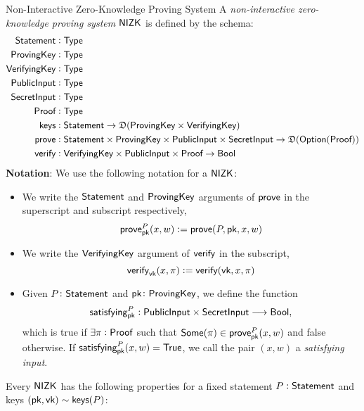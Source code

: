 \begin{definitiontoc}{Non-Interactive Zero-Knowledge Proving System}
    A \emph{non-interactive zero-knowledge proving system} ${\textsf{NIZK}}$ is defined by the schema:
    \begin{align*}
        {\textsf{Statement}}    &: {\textsf{Type}} \\
        {\textsf{ProvingKey}}   &: {\textsf{Type}} \\
        {\textsf{VerifyingKey}} &: {\textsf{Type}} \\
        {\textsf{PublicInput}}  &: {\textsf{Type}} \\
        {\textsf{SecretInput}}  &: {\textsf{Type}} \\
        {\textsf{Proof}}        &: {\textsf{Type}} \\
        {\textsf{keys}}         &: {\textsf{Statement}} \to \mathfrak{D}({\textsf{ProvingKey}} \times {\textsf{VerifyingKey}}) \\
        {\textsf{prove}}        &: {\textsf{Statement}} \times {\textsf{ProvingKey}} \times {\textsf{PublicInput}} \times {\textsf{SecretInput}} \to \mathfrak{D}({\textsf{Option}}({\textsf{Proof}})) \\
        {\textsf{verify}}       &: {\textsf{VerifyingKey}} \times {\textsf{PublicInput}} \times {\textsf{Proof}} \to {\textsf{Bool}}
    \end{align*}
    \textbf{Notation}: We use the following notation for a ${\textsf{NIZK}}$:
    \begin{itemize}
        \item We write the ${\textsf{Statement}}$ and ${\textsf{ProvingKey}}$ arguments of ${\textsf{prove}}$ in the superscript and subscript respectively,
            \[{\textsf{prove}}^P_{\textsf{pk}}(x, w) := {\textsf{prove}}(P, {\textsf{pk}}, x, w)\]
        \item We write the ${\textsf{VerifyingKey}}$ argument of ${\textsf{verify}}$ in the subscript,
            \[{\textsf{verify}}_{\textsf{vk}}(x, \pi) := {\textsf{verify}}({\textsf{vk}}, x, \pi)\]
        \item Given $P \colon {\textsf{Statement}}$ and ${\textsf{pk}} \colon {\textsf{ProvingKey}}$, we define the function
        \begin{align*}
            {\textsf{satisfying}}^P_{\textsf{pk}} : {\textsf{PublicInput}} \times {\textsf{SecretInput}} \longrightarrow {\textsf{Bool}}, 
        \end{align*}
        which is true if $\exists \pi : {\textsf{Proof}}$ such that ${\textsf{Some}}(\pi) \in {\textsf{prove}}^P_{\textsf{pk}}(x, w)$ and false otherwise. If ${\textsf{satisfying}}^P_{\textsf{pk}} (x, w) = {\textsf{True}}$, we call the pair $(x,w)$ a \emph{satisfying input}.
    \end{itemize}

    Every ${\textsf{NIZK}}$ has the following properties for a fixed statement $P : {\textsf{Statement}}$ and keys $({\textsf{pk}}, {\textsf{vk}}) \sim {\textsf{keys}}(P)$:


\end{definitiontoc}
